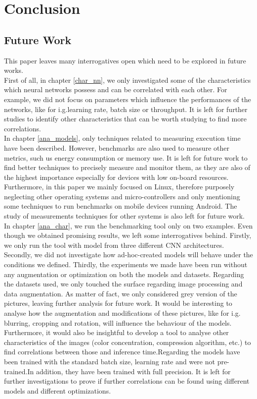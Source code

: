 \chapter{Conclusion}
\section{Future Work}
This paper leaves many interrogatives open which need to be explored in future works. \\
First of all, in chapter \ref{char_nn}, we only investigated some of the characteristics which neural networks possess and can be correlated with each other. For example, we did not focus on parameters which influence the performances of the networks, like for i.g.learning rate, batch size or throughput. It is left for further studies to identify other characteristics that can be worth studying to find more correlations.\\
In chapter \ref{ana_models}, only techniques related to measuring execution time have been described. However, benchmarks are also used to measure other metrics, such us energy consumption or memory use. It is left for future work to find better techniques to precisely measure and monitor them, as they are also of the highest importance especially for devices with low on-board resources. Furthermore, in this paper we mainly focused on Linux, therefore purposely neglecting other operating systems and micro-controllers and only mentioning some techniques to run benchmarks on mobile devices running Android. 
The study of measurements techniques for other systems is also left for future work. \\
In chapter \ref{ana_char}, we run the benchmarking tool only on two examples. Even though we obtained promising results, we left some interrogatives behind. Firstly, we only run the tool with model from three different CNN architectures. Secondly, we did not investigate how ad-hoc-created models will behave under the conditions we defined. Thirdly, the experiments we made have been run without any augmentation or optimization on both the models and datasets. Regarding the datasets used, we only touched the surface regarding image processing and data augmentation. As matter of fact, we only considered grey version of the pictures, leaving further analysis for future work. It would be interesting to analyse how the augmentation and modifications of these pictures, like for i.g. blurring, cropping and rotation, will influence the behaviour of the models. Furthermore, it would also be insightful to develop a tool to analyse other characteristics of the images (color concentration, compression algorithm, etc.) to find correlations between those and inference time.Regarding the models have been trained with the standard batch size, learning rate and were not pre-trained.In addition, they have been trained with full precision. It is left for further investigations to prove if further correlations can be found using different models and different optimizations.\\
